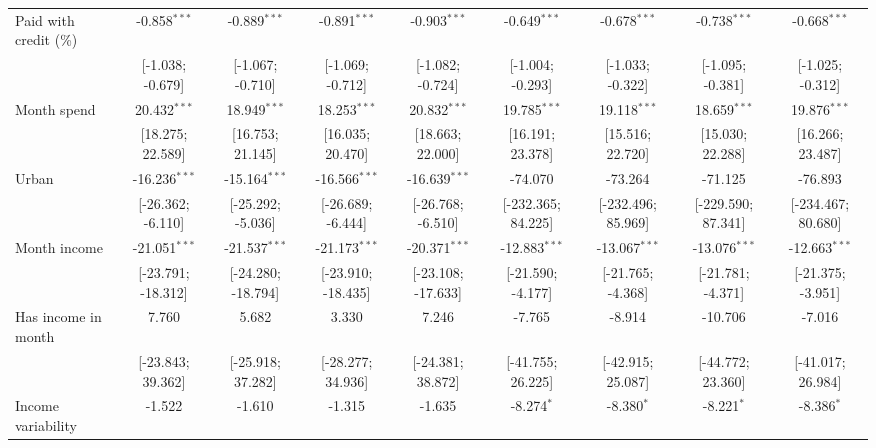 \begin{table}[htbp]
\begin{threeparttable}[b]
\begin{tabular}{lcccccccc}
         Paid with credit (\%)  & -0.858$^{***}$     & -0.889$^{***}$     & -0.891$^{***}$     & -0.903$^{***}$     & -0.649$^{***}$     & -0.678$^{***}$     & -0.738$^{***}$     & -0.668$^{***}$\\   
                                & [-1.038; -0.679]   & [-1.067; -0.710]   & [-1.069; -0.712]   & [-1.082; -0.724]   & [-1.004; -0.293]   & [-1.033; -0.322]   & [-1.095; -0.381]   & [-1.025; -0.312]\\   
         Month spend            & 20.432$^{***}$     & 18.949$^{***}$     & 18.253$^{***}$     & 20.832$^{***}$     & 19.785$^{***}$     & 19.118$^{***}$     & 18.659$^{***}$     & 19.876$^{***}$\\   
                                & [18.275; 22.589]   & [16.753; 21.145]   & [16.035; 20.470]   & [18.663; 22.000]   & [16.191; 23.378]   & [15.516; 22.720]   & [15.030; 22.288]   & [16.266; 23.487]\\   
         Urban                  & -16.236$^{***}$    & -15.164$^{***}$    & -16.566$^{***}$    & -16.639$^{***}$    & -74.070            & -73.264            & -71.125            & -76.893\\   
                                & [-26.362; -6.110]  & [-25.292; -5.036]  & [-26.689; -6.444]  & [-26.768; -6.510]  & [-232.365; 84.225] & [-232.496; 85.969] & [-229.590; 87.341] & [-234.467; 80.680]\\   
         Month income           & -21.051$^{***}$    & -21.537$^{***}$    & -21.173$^{***}$    & -20.371$^{***}$    & -12.883$^{***}$    & -13.067$^{***}$    & -13.076$^{***}$    & -12.663$^{***}$\\   
                                & [-23.791; -18.312] & [-24.280; -18.794] & [-23.910; -18.435] & [-23.108; -17.633] & [-21.590; -4.177]  & [-21.765; -4.368]  & [-21.781; -4.371]  & [-21.375; -3.951]\\   
         Has income in month    & 7.760              & 5.682              & 3.330              & 7.246              & -7.765             & -8.914             & -10.706            & -7.016\\   
                                & [-23.843; 39.362]  & [-25.918; 37.282]  & [-28.277; 34.936]  & [-24.381; 38.872]  & [-41.755; 26.225]  & [-42.915; 25.087]  & [-44.772; 23.360]  & [-41.017; 26.984]\\   
         Income variability     & -1.522             & -1.610             & -1.315             & -1.635             & -8.274$^{*}$       & -8.380$^{*}$       & -8.221$^{*}$       & -8.386$^{*}$\\   

\end{tabular}
\end{threeparttable}
\end{table}
